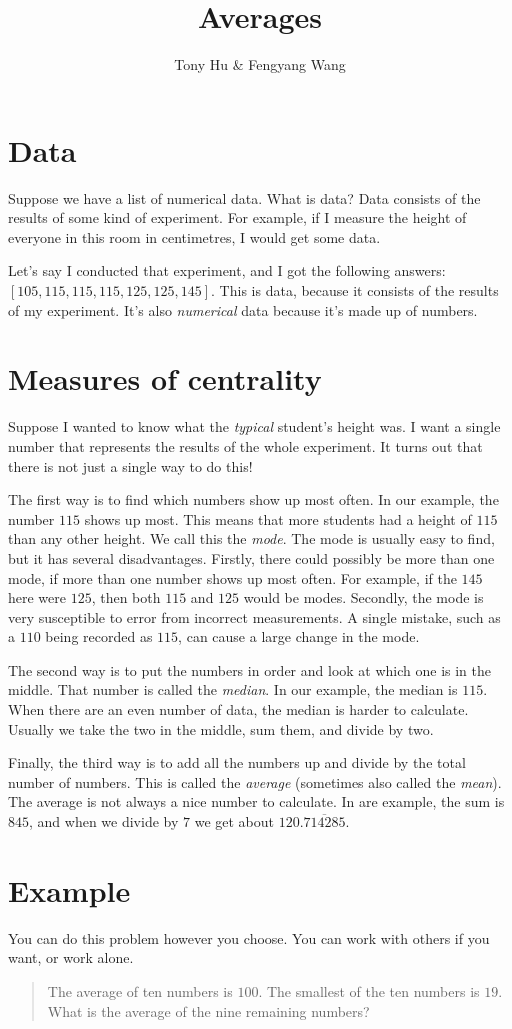 \documentclass[letterpaper,10pt]{article}
\title{Averages}
\author{Tony Hu \& Fengyang Wang}
\begin{document}
\maketitle

\section{Data}

Suppose we have a list of numerical data. What is data? Data 
consists of the results of some kind of experiment. For
example, if I measure the height of everyone in this room
in centimetres, I would get some data.

Let's say I conducted that experiment, and I got the following
answers: $[105, 115, 115, 115, 125, 125, 145]$. This is
data, because it consists of the results of my experiment.
It's also \emph{numerical} data because it's made up of
numbers.

\section{Measures of centrality}

Suppose I wanted to know what the \emph{typical} student's
height was. I want a single number that represents the 
results of the whole experiment. It turns out that there
is not just a single way to do this!

The first way is to find which numbers show up most often.
In our example, the number $115$ shows up most. This means
that more students had a height of $115$ than any other
height. We call this the \emph{mode}. The mode is usually
easy to find, but it has several disadvantages. Firstly,
there could possibly be more than one mode, if more than
one number shows up most often. For example, if the $145$
here were $125$, then both $115$ and $125$ would be modes.
Secondly, the mode is very susceptible to error from
incorrect measurements. A single mistake, such as a $110$
being recorded as $115$, can cause a large change in the
mode.

The second way is to put the numbers in order and look
at which one is in the middle. That number is called the
\emph{median}. In our example, the median is $115$.
When there are an even number of data, the median is harder
to calculate. Usually we take the two in the middle,
sum them, and divide by two.

Finally, the third way is to add all the numbers up and
divide by the total number of numbers. This is called the
\emph{average} (sometimes also called the \emph{mean}).
The average is not always a nice number to calculate.
In are example, the sum is $845$, and when we divide by
$7$ we get about $120.\overline{714285}$.

\section{Example}
You can do this problem however you choose. You can work with
others if you want, or work alone.

\begin{quotation}
 The average of ten numbers is $100$. The smallest of the ten numbers is $19$. What is the average
 of the nine remaining numbers?
\end{quotation}
\end{document}
